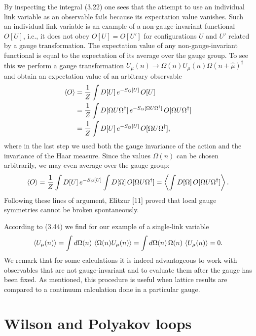 By inspecting the integral (3.22) one sees that the attempt to use an individual
link variable as an observable fails because its expectation value vanishes.
Such an individual link variable is an example of a non-gauge-invariant
functional $O[U]$, i.e., it does not obey $O[U] = O[U']$ for configurations $U$
and $U'$ related by a gauge transformation. The expectation value of any
non-gauge-invariant functional is equal to the expectation of its average over
the gauge group. To see this we perform a gauge transformation
$U_\mu(n) \to \Omega(n)U_\mu(n)\Omega(n+\hat\mu)^\dagger$ and obtain an
expectation value of an arbitrary observable
\begin{equation}
  \begin{split}
    \left\langle O \right\rangle &= \frac{1}{Z}\int D[U]\,e^{-S_G[U]}\,O[U]\\
    &= \frac{1}{Z}\int D[\Omega U\Omega^\dagger]\,e^{-S_G[\Omega U\Omega^\dagger]}
      \,O[\Omega U\Omega^\dagger]\\
    &= \frac{1}{Z}\int D[U]\,e^{-S_G[U]}\,O[\Omega U\Omega^\dagger] ,
  \end{split}
\end{equation}
where in the last step we used both the gauge invariance of the action and the
invariance of the Haar measure. Since the values $\Omega(n)$ can be chosen
arbitrarily, we may even average over the gauge group:
\begin{equation}
  \left\langle O \right\rangle = \frac{1}{Z}\int D[U]\,e^{-S_G[U]}
    \int D[\Omega]\,O[\Omega U\Omega^\dagger]
  = \left\langle \int D[\Omega]\,O[\Omega U\Omega^\dagger] \right\rangle .
\end{equation}
Following these lines of argument, Elitzur [11] proved that local gauge
symmetries cannot be broken spontaneously.

According to (3.44) we find for our example of a single-link variable
\begin{equation}
  \left\langle U_\mu(n) \right\rangle
  = \int d\Omega(n)\,\left\langle \Omega(n)U_\mu(n) \right\rangle
  = \int d\Omega(n)\,\Omega(n)\,\left\langle U_\mu(n) \right\rangle = 0 .
\end{equation}
We remark that for some calculations it is indeed advantageous to work with
observables that are not gauge-invariant and to evaluate them after the gauge
has been fixed. As mentioned, this procedure is useful when lattice results are
compared to a continuum calculation done in a particular gauge.

\section{Wilson and Polyakov loops}

